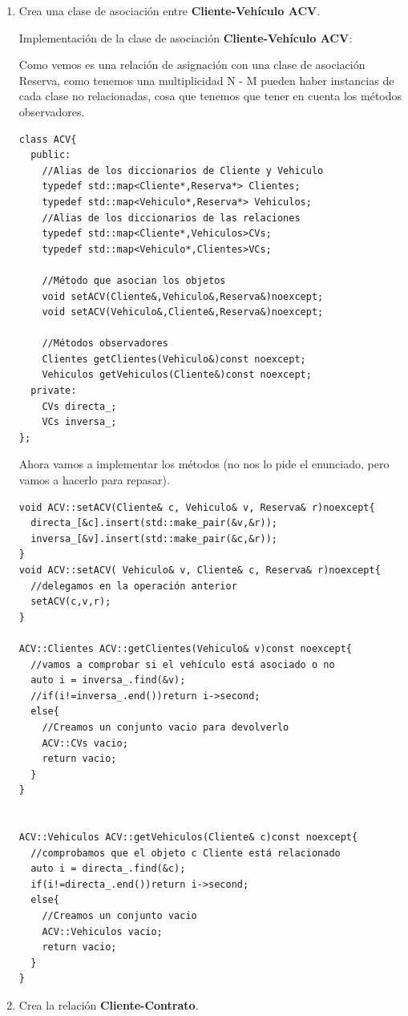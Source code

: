 \begin{enumerate}[label =\alph*)]
  \item Crea una clase de asociación entre \textbf{Cliente-Vehículo ACV}.

  Implementación de la clase de asociación  \textbf{Cliente-Vehículo ACV}:

  Como vemos es una relación de asignación con una clase de asociación Reserva, como tenemos una multiplicidad N - M pueden haber instancias de cada clase no relacionadas, cosa que tenemos que tener en cuenta los métodos observadores.
\begin{verbatim}
class ACV{
  public:
    //Alias de los diccionarios de Cliente y Vehiculo
    typedef std::map<Cliente*,Reserva*> Clientes;
    typedef std::map<Vehiculo*,Reserva*> Vehiculos;
    //Alias de los diccionarios de las relaciones
    typedef std::map<Cliente*,Vehiculos>CVs;
    typedef std::map<Vehiculo*,Clientes>VCs;

    //Método que asocian los objetos
    void setACV(Cliente&,Vehiculo&,Reserva&)noexcept;
    void setACV(Vehiculo&,Cliente&,Reserva&)noexcept;

    //Métodos observadores
    Clientes getClientes(Vehiculo&)const noexcept;
    Vehiculos getVehiculos(Cliente&)const noexcept;
  private:
    CVs directa_;
    VCs inversa_;
};
\end{verbatim}
\newpage
Ahora vamos a implementar los métodos (no nos lo pide el enunciado, pero vamos a hacerlo para repasar).
\begin{verbatim}
void ACV::setACV(Cliente& c, Vehiculo& v, Reserva& r)noexcept{
  directa_[&c].insert(std::make_pair(&v,&r));
  inversa_[&v].insert(std::make_pair(&c,&r));
}
void ACV::setACV( Vehiculo& v, Cliente& c, Reserva& r)noexcept{
  //delegamos en la operación anterior
  setACV(c,v,r);
}

ACV::Clientes ACV::getClientes(Vehiculo& v)const noexcept{
  //vamos a comprobar si el vehículo está asociado o no
  auto i = inversa_.find(&v);
  //if(i!=inversa_.end())return i->second;
  else{
    //Creamos un conjunto vacio para devolverlo
    ACV::CVs vacio;
    return vacio;
  }
}


ACV::Vehiculos ACV::getVehiculos(Cliente& c)const noexcept{
  //comprobamos que el objeto c Cliente está relacionado
  auto i = directa_.find(&c);
  if(i!=directa_.end())return i->second;
  else{
    //Creamos un conjunto vacio
    ACV::Vehiculos vacio;
    return vacio;
  }
}
\end{verbatim}
  \item Crea la relación \textbf{Cliente-Contrato}.


\end{enumerate}
